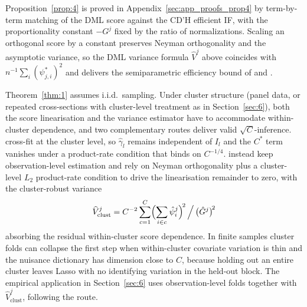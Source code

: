 Proposition~\ref{prop:4} is proved in Appendix~\ref{sec:app_proofs_prop4} by term-by-term matching of the DML score against the CD'H efficient IF, with the proportionality constant $-G^j$ fixed by the ratio of normalizations. Scaling an orthogonal score by a constant preserves Neyman orthogonality and the asymptotic variance, so the DML variance formula $\hat{V}^j$ above coincides with $n^{-1}\sum_i(\psi^{*}_{j,i})^2$ and delivers the semiparametric efficiency bound of \citet{hahn1998} and \citet{newey1994asymptotic}.

\begin{remark}\label{rem:cluster}
Theorem~\ref{thm:1} assumes i.i.d.\ sampling. Under cluster structure (panel data, or repeated cross-sections with cluster-level treatment as in Section~\ref{sec:6}), both the score linearisation and the variance estimator have to accommodate within-cluster dependence, and two complementary routes deliver valid $\sqrt{C}$-inference. \citet{chiang2022multiway} cross-fit at the cluster level, so $\hat{\gamma}_l$ remains independent of $I_l$ and the $C^*$ term vanishes under a product-rate condition that binds on $C^{-1/4}$. \citet{belloni2017program} instead keep observation-level estimation and rely on Neyman orthogonality plus a cluster-level $L_2$ product-rate condition to drive the linearisation remainder to zero, with the cluster-robust variance
\[
    \widehat{V}^{j}_{\text{clust}} = C^{-2}\sum_{c=1}^{C}\Bigl(\sum_{i\in c}\hat{\psi}^{j}_{i}\Bigr)^{\!2}\,\Big/\,\bigl(\hat{G}^{j}\bigr)^{\!2}
\]
absorbing the residual within-cluster score dependence. In finite samples cluster folds can collapse the first step when within-cluster covariate variation is thin and the nuisance dictionary has dimension close to $C$, because holding out an entire cluster leaves Lasso with no identifying variation in the held-out block. The empirical application in Section~\ref{sec:6} uses observation-level folds together with $\widehat{V}^{j}_{\text{clust}}$, following the \citet{belloni2017program} route.
\end{remark}
